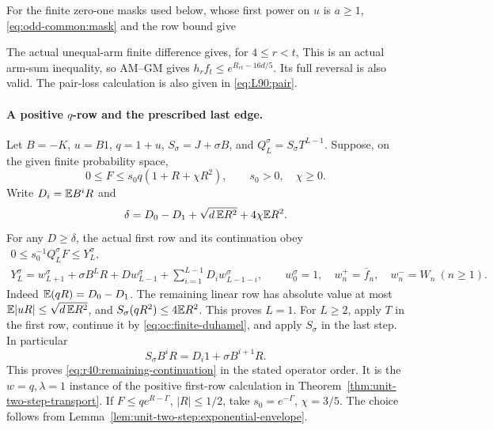 For the finite zero-one masks used below, whose first power on
\(u\) is \(a\ge1\),
\eqref{eq:odd-common:mask} and the row bound give

The actual unequal-arm finite difference gives, for \(4\le r<t\),
This is an actual arm-sum inequality, so AM--GM gives
\(h_rf_t\le e^{R_{rt}-16d/5}\). Its full reversal is also valid.
The pair-loss calculation is also given in \eqref{eq:L90:pair}.


\paragraph{A positive \(q\)-row and the prescribed last edge.}
\label{part:r40:remaining-transport}
Let \(B=-K\), \(u=B1\), \(q=1+u\), \(S_\sigma=J+\sigma B\),
and \(Q_L^\sigma=S_\sigma T^{L-1}\).
Suppose, on the given finite probability space,
\[
 0\le F\le s_0q(1+R+\chi R^2),\qquad s_0>0,\quad\chi\ge0.
\]
Write \(D_i=\mathbb E B^iR\) and
\begin{equation}\label{eq:r40:remaining-first-row}
 \delta=D_0-D_1+\sqrt{d\,\mathbb E R^2}+4\chi\mathbb E R^2 .
\end{equation}
For any \(D\ge\delta\), the actual first row and its continuation obey
\begin{equation}\label{eq:r40:remaining-continuation}
 \begin{gathered}
 0\le s_0^{-1}Q_L^\sigma F\le Y_L^\sigma,\\
 Y_L^\sigma=w_{L+1}^\sigma+\sigma B^LR+D w_{L-1}^\sigma
              +\sum_{i=1}^{L-1}D_iw_{L-1-i}^\sigma,\qquad
 w_0^\sigma=1,\quad w_n^+=\bar f_n,\quad w_n^-=W_n\ (n\ge1).
 \end{gathered}
\end{equation}
Indeed \(\mathbb E(qR)=D_0-D_1\).
The remaining linear row has absolute value at most
\(\mathbb E|uR|\le\sqrt{d\,\mathbb E R^2}\), and
\(S_\sigma(qR^2)\le4\mathbb E R^2\).
This proves \(L=1\). For \(L\ge2\), apply \(T\) in the first row,
continue it by \eqref{eq:oc:finite-duhamel}, and apply \(S_\sigma\) in the last
step. In particular
\[
 S_\sigma B^iR=D_i1+\sigma B^{i+1}R .
\]
This proves \eqref{eq:r40:remaining-continuation} in the stated operator order.
It is the \(w=q,\lambda=1\) instance of the positive first-row
calculation in Theorem~\ref{thm:unit-two-step-transport}.
If \(F\le qe^{R-\Gamma}\), \(|R|\le1/2\), take
\(s_0=e^{-\Gamma}\), \(\chi=3/5\).
The choice follows from
Lemma~\ref{lem:unit-two-step:exponential-envelope}.

